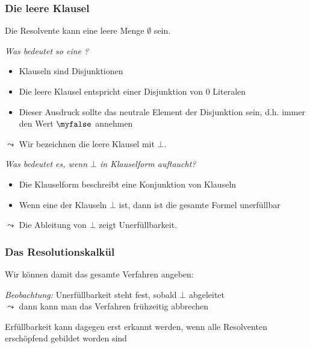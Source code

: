 \documentclass[aspectratio=1610,onlymath]{beamer}
\begin{document}
\begin{frame}\frametitle{Die leere Klausel}

Die Resolvente kann eine leere Menge $\emptyset$ sein.\\[1ex]

\medskip

\emph{Was bedeutet so eine ?}\pause
\begin{itemize}
\item Klauseln sind Disjunktionen
\item Die leere Klausel entspricht einer Disjunktion von $0$ Literalen
\item Dieser Ausdruck sollte das neutrale Element der Disjunktion sein, d.h. immer den Wert $\myfalse$ annehmen
\end{itemize}
$\leadsto$ Wir bezeichnen die leere Klausel mit $\bot$.
\bigskip\pause

\emph{Was bedeutet es, wenn $\bot$ in Klauselform auftaucht?}\pause
\begin{itemize}
\item Die Klauselform beschreibt eine Konjunktion von Klauseln
\item Wenn eine der Klauseln $\bot$ ist, dann ist die gesamte Formel unerfüllbar
\end{itemize}
$\leadsto$ Die Ableitung von $\bot$ zeigt Unerfüllbarkeit.

\end{frame}

\begin{frame}\frametitle{Das Resolutionskalkül}

Wir können damit das gesamte Verfahren angeben:

\pause

\emph{Beobachtung:} Unerfüllbarkeit steht fest, sobald $\bot$ abgeleitet \\
$\leadsto$ dann kann man das Verfahren frühzeitig abbrechen
\medskip

Erfüllbarkeit kann dagegen erst erkannt werden, wenn alle Resolventen erschöpfend gebildet worden sind

\end{frame}
\end{document}

